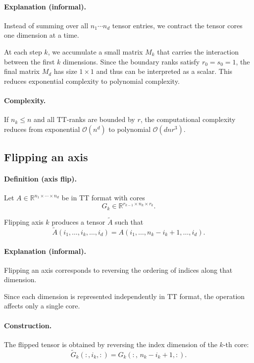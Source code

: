 \documentclass[11pt,a4paper,parskip=half-]{scrartcl}
\theoremstyle{definition}
\theoremstyle{plain}
\theoremstyle{remark}
\begin{document}
\paragraph{Explanation (informal).}
Instead of summing over all $n_1\cdots n_d$ tensor entries,
we contract the tensor cores one dimension at a time.

At each step $k$, we accumulate a small matrix $M_k$ that carries the
interaction between the first $k$ dimensions. Since the boundary ranks satisfy
$r_0=s_0=1$, the final matrix $M_d$ has size $1\times 1$ and thus can be
interpreted as a scalar. This reduces exponential complexity to polynomial
complexity.

\paragraph{Complexity.}

If $n_k \le n$ and all TT-ranks are bounded by $r$, the computational complexity
reduces from exponential $\mathcal{O}(n^d)$ to polynomial $\mathcal{O}(dnr^3)$.

\subsection{Flipping an axis}

\paragraph{Definition (axis flip).}
Let $A \in \mathbb{R}^{n_1 \times \cdots \times n_d}$ be in TT format with cores
\[
G_k \in \mathbb{R}^{r_{k-1} \times n_k \times r_k}.
\]

Flipping axis $k$ produces a tensor $\tilde{A}$ such that
\[
\tilde{A}(i_1,\dots,i_k,\dots,i_d)
=
A(i_1,\dots,n_k - i_k + 1,\dots,i_d).
\]

\paragraph{Explanation (informal).}
Flipping an axis corresponds to reversing the ordering of indices along that
dimension.

Since each dimension is represented independently in TT format, the operation
affects only a single core.

\paragraph{Construction.}
The flipped tensor is obtained by reversing the index dimension of the $k$-th core:
\[
\tilde{G}_k(:, i_k, :) = G_k(:,\, n_k - i_k + 1, :).
\]
\end{document}
